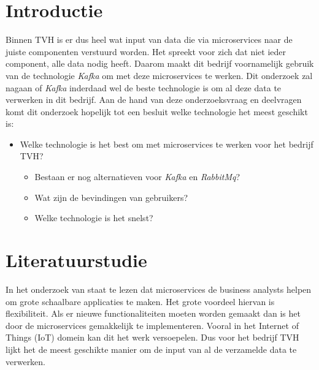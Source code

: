 
\section{Introductie} %
\label{sec:introductie}
Binnen TVH is er dus heel wat input van data die via microservices naar de juiste componenten verstuurd worden. Het spreekt voor zich dat niet ieder component, alle data nodig heeft. Daarom maakt dit bedrijf voornamelijk gebruik van de technologie \emph{Kafka} om met deze microservices te werken. Dit onderzoek zal nagaan of \emph{Kafka} inderdaad wel de beste technologie is om al deze data te verwerken in dit bedrijf. Aan de hand van deze onderzoeksvraag en deelvragen komt dit onderzoek hopelijk tot een besluit welke technologie het meest geschikt is:
\begin{itemize}
    \item Welke technologie is het best om met microservices te werken voor het bedrijf TVH?
    \begin{itemize}
        \item Bestaan er nog alternatieven voor \emph{Kafka} en \emph{RabbitMq}?
        \item Wat zijn de bevindingen van gebruikers?
        \item Welke technologie is het snelst?
    \end{itemize}
\end{itemize}



\section{Literatuurstudie}
\label{sec:Literatuurstudie}
In het onderzoek van \textcite{Shadija2017} staat te lezen dat microservices de business analysts helpen om grote schaalbare applicaties te maken. Het grote voordeel hiervan is flexibiliteit. Als er nieuwe functionaliteiten moeten worden gemaakt dan is het door de microservices gemakkelijk te implementeren. Vooral in het Internet of Things (IoT) domein kan dit het werk versoepelen. Dus voor het bedrijf TVH lijkt het de meest geschikte manier om de input van al de verzamelde data te verwerken.

